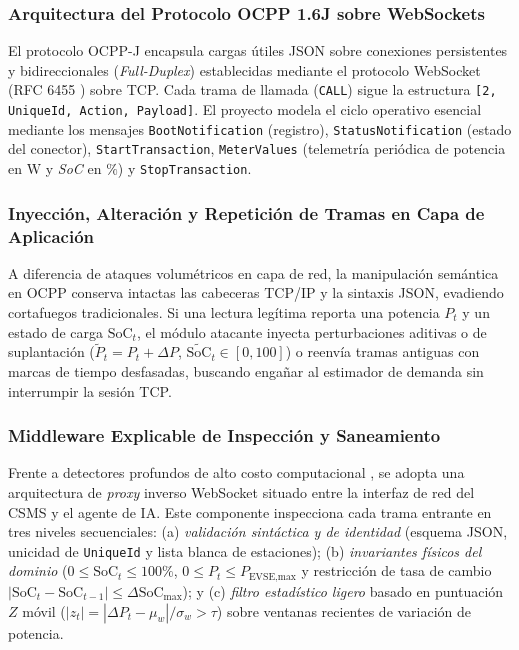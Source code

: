 \documentclass[conference]{IEEEtran}
\begin{document}
\subsubsection{Arquitectura del Protocolo OCPP 1.6J sobre WebSockets}
El protocolo OCPP-J encapsula cargas útiles JSON sobre conexiones persistentes y bidireccionales (\textit{Full-Duplex}) establecidas mediante el protocolo WebSocket (RFC 6455 \cite{rfc6455}) sobre TCP. Cada trama de llamada (\texttt{CALL}) sigue la estructura \texttt{[2, UniqueId, Action, Payload]}. El proyecto modela el ciclo operativo esencial mediante los mensajes \texttt{BootNotification} (registro), \texttt{StatusNotification} (estado del conector), \texttt{StartTransaction}, \texttt{MeterValues} (telemetría periódica de potencia en $\text{W}$ y \textit{SoC} en $\%$) y \texttt{StopTransaction}.

\subsubsection{Inyección, Alteración y Repetición de Tramas en Capa de Aplicación}
A diferencia de ataques volumétricos en capa de red, la manipulación semántica en OCPP conserva intactas las cabeceras TCP/IP y la sintaxis JSON, evadiendo cortafuegos tradicionales. Si una lectura legítima reporta una potencia $P_t$ y un estado de carga $\text{SoC}_t$, el módulo atacante inyecta perturbaciones aditivas o de suplantación ($\tilde{P}_t = P_t + \Delta P$, $\widetilde{\text{SoC}}_t \in [0,100]$) o reenvía tramas antiguas con marcas de tiempo desfasadas, buscando engañar al estimador de demanda sin interrumpir la sesión TCP.

\subsubsection{Middleware Explicable de Inspección y Saneamiento}
Frente a detectores profundos de alto costo computacional \cite{jahangir2024,terruggia2025}, se adopta una arquitectura de \textit{proxy} inverso WebSocket situado entre la interfaz de red del CSMS y el agente de IA. Este componente inspecciona cada trama entrante en tres niveles secuenciales: (a) \textit{validación sintáctica y de identidad} (esquema JSON, unicidad de \texttt{UniqueId} y lista blanca de estaciones); (b) \textit{invariantes físicos del dominio} ($0 \le \text{SoC}_t \le 100\%$, $0 \le P_t \le P_{\text{EVSE,max}}$ y restricción de tasa de cambio $|\text{SoC}_t - \text{SoC}_{t-1}| \le \Delta \text{SoC}_{\max}$); y (c) \textit{filtro estadístico ligero} basado en puntuación $Z$ móvil ($|z_t| = |\Delta P_t - \mu_w|/\sigma_w > \tau$) sobre ventanas recientes de variación de potencia.
\end{document}
